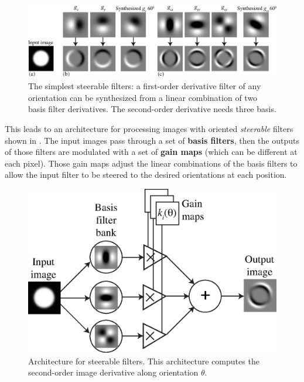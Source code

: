 %



\begin{figure}[h]
\centerline{
\includegraphics[width=1\linewidth]{figures/spatial_filter_sets/steer1.eps}
}
\caption{The simplest steerable filters: a first-order derivative filter of any
  orientation can be synthesized from a linear combination of two
  basis filter derivatives. The second-order derivative needs three basis.}
\label{fig:steer1}
\end{figure}





This leads to an architecture for processing images with oriented {\em steerable} filters shown in \fig{\ref{fig:steer1arc}}. The input images pass through a set of {\bf basis filters},
then the outputs of those filters are modulated with a set of {\bf gain maps}
(which can be different at each pixel).  Those gain maps adjust the
linear combinations of the basis filters to allow the input
filter to be steered to the desired orientations at each position.  

\begin{figure}[h]
\centerline{
\includegraphics[width=0.6\linewidth]{figures/spatial_filter_sets/steer_architecture.eps} 
}
\caption{Architecture for steerable filters. This architecture computes the second-order image derivative along orientation $\theta$.}
\label{fig:steer1arc}
\end{figure}

